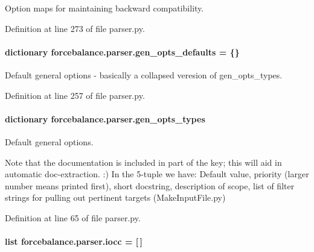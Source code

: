 Option maps for maintaining backward compatibility. 



Definition at line 273 of file parser.\-py.

\hypertarget{namespaceforcebalance_1_1parser_a980fd024b1f2877247de482247250b9e}{
\paragraph[{gen\-\_\-opts\-\_\-defaults}]{\setlength{\rightskip}{0pt plus 5cm}dictionary forcebalance.\-parser.\-gen\-\_\-opts\-\_\-defaults = \{\}}}\label{namespaceforcebalance_1_1parser_a980fd024b1f2877247de482247250b9e}


Default general options -\/ basically a collapsed veresion of gen\-\_\-opts\-\_\-types. 



Definition at line 257 of file parser.\-py.

\hypertarget{namespaceforcebalance_1_1parser_a1ccdff008f4be5f63c068d2a592d69ab}{
\paragraph[{gen\-\_\-opts\-\_\-types}]{\setlength{\rightskip}{0pt plus 5cm}dictionary forcebalance.\-parser.\-gen\-\_\-opts\-\_\-types}}\label{namespaceforcebalance_1_1parser_a1ccdff008f4be5f63c068d2a592d69ab}


Default general options. 

Note that the documentation is included in part of the key; this will aid in automatic doc-\/extraction. \-:) In the 5-\/tuple we have\-: Default value, priority (larger number means printed first), short docstring, description of scope, list of filter strings for pulling out pertinent targets (Make\-Input\-File.\-py) 

Definition at line 65 of file parser.\-py.

\hypertarget{namespaceforcebalance_1_1parser_a150e23172366de5938d0f32018d0b58b}{
\paragraph[{iocc}]{\setlength{\rightskip}{0pt plus 5cm}list forcebalance.\-parser.\-iocc = \mbox{[}$\,$\mbox{]}}}\label{namespaceforcebalance_1_1parser_a150e23172366de5938d0f32018d0b58b}


